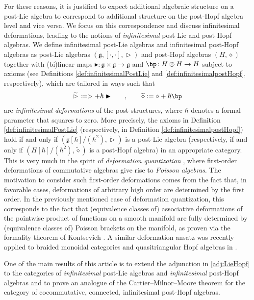 \documentclass[10pt]{article}
\theoremstyle{definition}
\newcommand{\wt}{\vartriangleright}
\newcommand{\bt}{\blacktriangleright}
\renewcommand{\wp}{\diamond}
\begin{document}
\noindent
For these reasons, it is justified to expect additional algebraic structure on a post-Lie algebra to correspond to additional structure on the post-Hopf algebra level and vice versa. We focus on this correspondence and discuss infinitesimal deformations, leading to the notions of \emph{infinitesimal} post-Lie and post-Hopf algebras. We define infinitesimal post-Lie algebras and infinitesimal post-Hopf algebras as post-Lie algebras $(\mathfrak{g},[\cdot,\cdot],\wt)$ and post-Hopf algebras $(H,\wp)$ together with (bi)linear maps $\bt\colon\mathfrak{g}\times\mathfrak{g}\to\mathfrak{g}$ and $\bp\colon H\otimes H\to H$ subject to axioms (see Definitions \ref{def:infinitesimalPostLie} and \ref{def:infinitesimalpostHopf}, respectively), which are tailored in ways such that
	\begin{equation}
	\widetilde{\wt}:=\wt+\hbar\bt\qquad,\qquad
	\widetilde{\wp}:=\wp+\hbar\bp
	\end{equation}
	are \emph{infinitesimal deformations} of the post structures, where $\hbar$ denotes a formal parameter that squares to zero. More precisely, the axioms in Definition \ref{def:infinitesimalPostLie} (respectively, in Definition \ref{def:infinitesimalpostHopf}) hold if and only if $(\mathfrak{g}[\hbar]/(\hbar^2),\widetilde{\wt})$ is a post-Lie algebra (respectively, if and only if $(H[\hbar]/(\hbar^2),\widetilde{\wp})$ is a post-Hopf algebra) in an appropriate category. This is very much in the spirit of \emph{deformation quantization} \cite{BFFLS}, where first-order deformations of commutative algebras give rise to \emph{Poisson algebras}. The motivation to consider such first-order deformations comes from the fact that, in favorable cases, deformations of arbitrary high order are determined by the first order. In the previously mentioned case of deformation quantization, this corresponds to the fact that (equivalence classes of) associative deformations of the pointwise product of functions on a smooth manifold are fully determined by (equivalence classes of) Poisson brackets on the manifold, as proven via the formality theorem of Kontsevich \cite{Kontsevich}. A similar deformation ansatz was recently applied to braided monoidal categories and quasitriangular Hopf algebras in \cite{ABSW,ERSW}.

    One of the main results of this article is to extend the adjunction in \eqref{adj:LieHopf} to the categories of \emph{infinitesimal} post-Lie algebras and \emph{infinitesimal} post-Hopf algebras and to prove an analogue of the Cartier--Milnor--Moore theorem for the category of cocommutative, connected, infinitesimal post-Hopf algebras.
	
\end{document}
